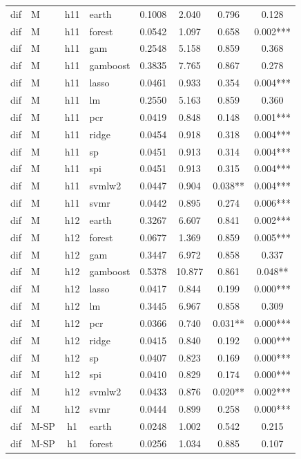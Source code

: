 \begin{ThreePartTable}
\begin{longtable}[t]{llclcccc}
\addlinespace
dif & M & h11 & earth & 0.1008 & 2.040 & 0.796 & 0.128\\
dif & M & h11 & forest & 0.0542 & 1.097 & 0.658 & 0.002***\\
dif & M & h11 & gam & 0.2548 & 5.158 & 0.859 & 0.368\\
dif & M & h11 & gamboost & 0.3835 & 7.765 & 0.867 & 0.278\\
dif & M & h11 & lasso & 0.0461 & 0.933 & 0.354 & 0.004***\\
dif & M & h11 & lm & 0.2550 & 5.163 & 0.859 & 0.360\\
dif & M & h11 & pcr & 0.0419 & 0.848 & 0.148 & 0.001***\\
dif & M & h11 & ridge & 0.0454 & 0.918 & 0.318 & 0.004***\\
dif & M & h11 & sp & 0.0451 & 0.913 & 0.314 & 0.004***\\
dif & M & h11 & spi & 0.0451 & 0.913 & 0.315 & 0.004***\\
dif & M & h11 & svmlw2 & 0.0447 & 0.904 & 0.038** & 0.004***\\
dif & M & h11 & svmr & 0.0442 & 0.895 & 0.274 & 0.006***\\
\addlinespace
dif & M & h12 & earth & 0.3267 & 6.607 & 0.841 & 0.002***\\
dif & M & h12 & forest & 0.0677 & 1.369 & 0.859 & 0.005***\\
dif & M & h12 & gam & 0.3447 & 6.972 & 0.858 & 0.337\\
dif & M & h12 & gamboost & 0.5378 & 10.877 & 0.861 & 0.048**\\
dif & M & h12 & lasso & 0.0417 & 0.844 & 0.199 & 0.000***\\
dif & M & h12 & lm & 0.3445 & 6.967 & 0.858 & 0.309\\
dif & M & h12 & pcr & 0.0366 & 0.740 & 0.031** & 0.000***\\
dif & M & h12 & ridge & 0.0415 & 0.840 & 0.192 & 0.000***\\
dif & M & h12 & sp & 0.0407 & 0.823 & 0.169 & 0.000***\\
dif & M & h12 & spi & 0.0410 & 0.829 & 0.174 & 0.000***\\
dif & M & h12 & svmlw2 & 0.0433 & 0.876 & 0.020** & 0.002***\\
dif & M & h12 & svmr & 0.0444 & 0.899 & 0.258 & 0.000***\\
\addlinespace
dif & M-SP & h1 & earth & 0.0248 & 1.002 & 0.542 & 0.215\\
dif & M-SP & h1 & forest & 0.0256 & 1.034 & 0.885 & 0.107\\

\end{longtable}
\end{ThreePartTable}
